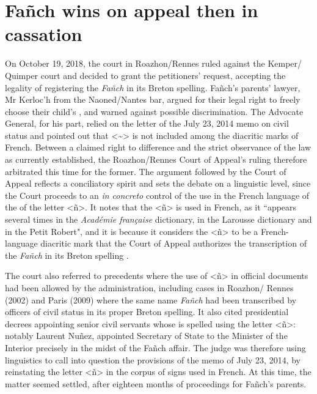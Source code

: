 \documentclass[output=paper,colorlinks,citecolor=brown]{langscibook}
\begin{document}
\section{Fañch wins on appeal then in cassation}

On October 19, 2018, the court in Roazhon/Rennes ruled against the Kemper/ Quimper court and decided to grant the petitioners' request, accepting the legality of registering the  \textit{Fañch} in its Breton spelling. Fañch's parents' lawyer, Mr Kerloc'h from the Naoned/Nantes bar, argued for their legal right to freely choose their child’s , and warned against possible discrimination. The Advocate General, for his part, relied on the letter of the July 23, 2014 memo on civil status and pointed out that <{\textasciitilde}> is not included among the diacritic marks of French. Between a claimed right to difference and the strict observance of the law as currently established, the Roazhon/Rennes Court of Appeal's ruling therefore arbitrated this time for the former. The argument followed by the Court of Appeal reflects a conciliatory spirit and sets the debate on a linguistic level, since the Court proceeds to an \textit{in concreto} control of the use in the French language of the  of the letter <ñ>. It notes that the <ñ> is used in French, as it ``appears several times in the \textit{Académie française} dictionary, in the Larousse dictionary and in the Petit Robert", and it is because it considers the <ñ> to be a French-language diacritic mark that the Court of Appeal authorizes the transcription of the  \textit{Fañch} in its Breton spelling \citep{sm:Gicquel2019}.

The court also referred to precedents where the use of <ñ> in official documents had been allowed by the administration, including cases in Roazhon/ Rennes (2002) and Paris (2009) where the same name \textit{Fañch} had been transcribed by officers of civil status in its proper Breton spelling. It also cited presidential decrees appointing senior civil servants whose  is spelled using the letter <ñ>: notably Laurent Nuñez, appointed Secretary of State to the Minister of the Interior precisely in the midst of the Fañch affair. The judge was therefore using linguistics to call into question the provisions of the memo of July 23, 2014, by reinstating the letter <ñ> in the corpus of signs used in French. At this time, the matter seemed settled, after eighteen months of proceedings for Fañch’s parents.
\end{document}
